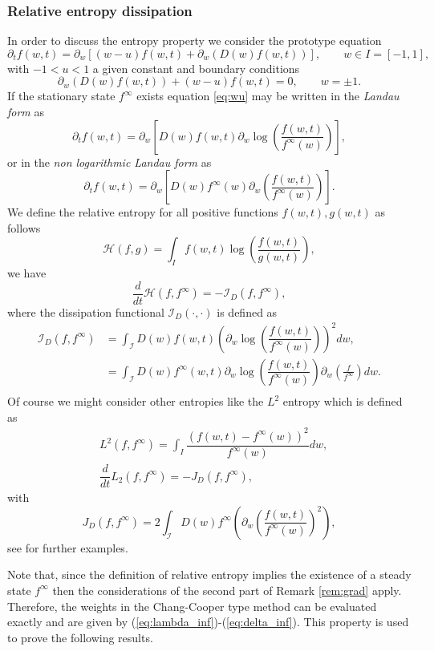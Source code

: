 \documentclass[a4paper]{article}
\theoremstyle{remark}\newtheorem{remark}{Remark}
\newcommand{\be}{\begin{equation}}
\newcommand{\ee}{\end{equation}}
\begin{document}


\subsubsection{Relative entropy dissipation}
In order to discuss the entropy property we consider the prototype equation 
\be\label{eq:wu}
\partial_t f(w,t) = \partial_w \left[ (w-u)f(w,t) + \partial_w (D(w)f(w,t)) \right], \qquad w\in  I=[-1,1],
\ee
with $-1<u<1$ a given constant and boundary conditions
\be\label{eq:wu_boundary}
\partial_w (D(w)f(w,t))+(w-u)f(w,t) = 0, \qquad w=\pm1.
\ee
If the stationary state $f^\infty$ exists equation \eqref{eq:wu} may be written in the \emph{Landau form} as
\be
\partial_t f(w,t) = \partial_w \left[ D(w)f(w,t)\partial_w \log\left( \dfrac{f(w,t)}{f^{\infty}(w)} \right) \right],
\label{eq:landau}
\ee
or in the \emph{non logarithmic Landau form} as
\be\label{eq:nonlog_landau}
\partial_t f(w,t) = \partial_w \left[ D(w)f^{\infty}(w)\partial_w \left(\dfrac{f(w,t)}{f^{\infty}(w)}\right) \right].
\ee
We define the relative entropy for all positive functions $f(w,t),g(w,t)$ as follows
\be\label{eq:rel_entropy}
\mathcal H(f,g) = \int_I f(w,t) \log\left(\dfrac{f(w,t)}{g(w,t)} \right),
\ee
we have \cite{FPTT_K}
\be
\dfrac{d}{dt}\mathcal H(f,f^{\infty}) = -\mathcal I_D(f,f^{\infty}),
\ee
where the dissipation functional $\mathcal I_D(\cdot,\cdot)$ is defined as 
\be\begin{split}
\mathcal I_D(f,f^{\infty})& = 
 \int_{\mathcal I} D(w)f(w,t)\left(\partial_w \log \left( \dfrac{f(w,t)}{f^{\infty}(w)}\right)\right)^2dw,\\
& = 
 \int_{\mathcal I} D(w)f^{\infty}(w,t)\partial_w \log \left( \dfrac{f(w,t)}{f^{\infty}(w)}\right)\partial_w\left(\frac{f}{f^{\infty}}\right)dw.\\ 
\end{split}\ee
Of course we might consider other entropies like the $L^2$ entropy which is defined as
\be\begin{split}
&L^2(f,f^{\infty}) = \int_{I}\dfrac{(f(w,t)-f^{\infty}(w))^2}{f^{\infty}(w)}dw,\\
&\dfrac{d}{dt}L_2(f,f^{\infty})= -J_D(f,f^{\infty}),
\end{split}\ee
with 
\be
J_D(f,f^{\infty}) = 2\int_{\mathcal I}D(w)f^{\infty}\left(\partial_w \left(\dfrac{f(w,t)}{f^{\infty}(w)}\right)^2\right),
\ee
see \cite{FPTT_K} for further examples.

Note that, since the definition of relative entropy implies the existence of a steady state $f^{\infty}$ then the considerations of the second part of Remark \ref{rem:grad} apply. Therefore, the weights in the Chang-Cooper type method can be evaluated exactly and are given by (\ref{eq:lambda_inf})-(\ref{eq:delta_inf}). This property is used to prove the following results.
\end{document}
